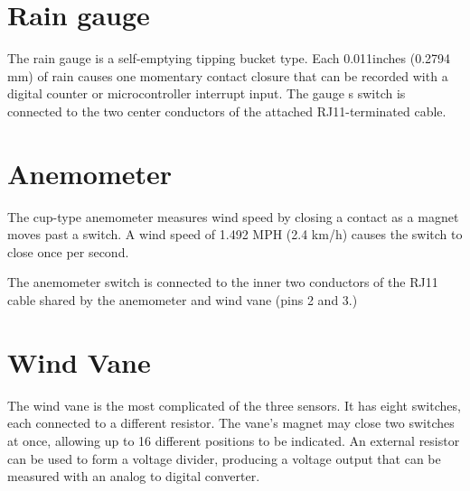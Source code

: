 \documentclass[
10pt, %
a4paper, %
oneside, %
headinclude,footinclude, %
BCOR5mm, %
]{scrartcl}
\begin{document}
\section{Rain gauge}
The rain gauge is a self-emptying tipping bucket type. Each 0.011inches
(0.2794 mm) of rain causes one momentary contact closure that can
be recorded with a digital counter or microcontroller interrupt input.
The gauge s switch is connected to the two center conductors of the
attached RJ11-terminated cable.

\section{Anemometer}
The cup-type anemometer measures wind speed by closing a contact
as a magnet moves past a switch. A wind speed of 1.492 MPH (2.4
km/h) causes the switch to close once per second.

The anemometer switch is connected to the inner two conductors of
the RJ11 cable shared by the anemometer and wind vane (pins 2 and
3.)

\section{Wind Vane}
The wind vane is the most complicated of the three sensors. It has
eight switches, each connected to a different resistor. The vane’s
magnet may close two switches at once, allowing up to 16 different
positions to be indicated. An external resistor can be used to form a
voltage divider, producing a voltage output that can be measured with
an analog to digital converter.

%

\end{document}

